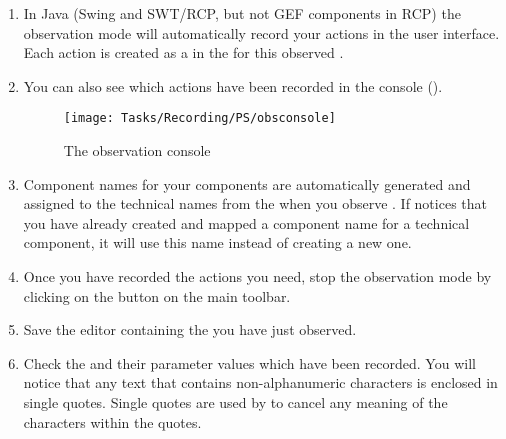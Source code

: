 \label{TasksObserveJava}

\begin{enumerate}
\item  In Java \gdauts{} (Swing and SWT/RCP, but not GEF components in RCP) the observation mode will automatically record your actions in the user interface. Each action is created as a \gdstep{} in the \gdtestcaseeditor{} for this observed \gdcase{}. 


\item You can also see which actions have been recorded in the console ().

\begin{figure}[h]
\begin{center}
\texttt{[image: Tasks/Recording/PS/obsconsole]}
\caption{The observation console}
\label{obsconsole}
\end{center}
\end{figure}


 

\item Component names for your components are automatically generated and assigned to the technical names from the \gdaut{} when you observe \gdsteps{}. If \app{} notices that you have already created and mapped a component name for a technical component, it will use this name instead of creating a new one. 
\item Once you have recorded the actions you need, stop the observation mode by clicking on the  button 
on the main toolbar.
\item Save the \gdcase{} editor containing the \gdsteps{} you have just observed. 
\item Check the \gdsteps{} and their parameter values which have been recorded. 
You will notice that any text that contains non-alphanumeric characters is enclosed in single quotes. Single quotes are used by \app{} to cancel any meaning of the characters within the quotes. 
\end{enumerate}

